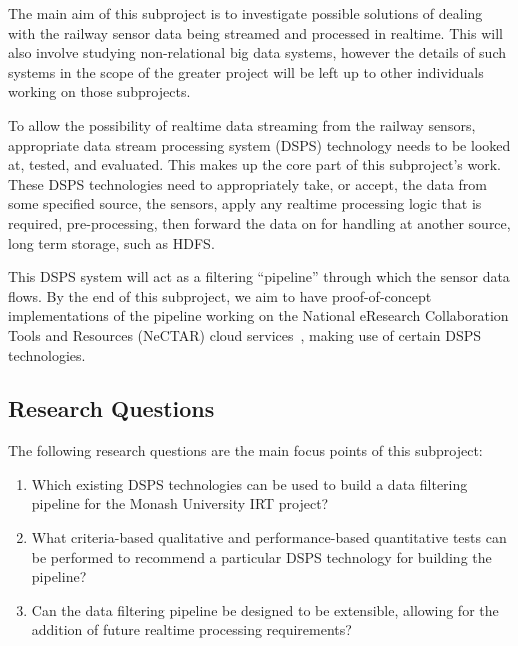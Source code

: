The main aim of this subproject is to investigate possible solutions of dealing with the railway sensor data being
streamed and processed in realtime. This will also involve studying non-relational big data systems, however the details
of such systems in the scope of the greater project will be left up to other individuals working on those subprojects.

To allow the possibility of realtime data streaming from the railway sensors, appropriate data stream processing system
(DSPS) technology needs to be looked at, tested, and evaluated. This makes up the core part of this subproject's work.
These DSPS technologies need to appropriately take, or accept, the data from some specified source, \eg the sensors, apply
any realtime processing logic that is required, \eg pre-processing, then forward the data on for handling at
another source, \eg long term storage, such as HDFS.

This DSPS system will act as a filtering ``pipeline'' through which the sensor data flows.
By the end of this subproject, we aim to have proof-of-concept implementations of the pipeline working on the National
eResearch Collaboration Tools and Resources (NeCTAR) cloud services~\cite{web:Nectar}, making use of certain DSPS
technologies.




\subsection{Research Questions} %
\label{sub:research_questions}

The following research questions are the main focus points of this subproject:

\begin{enumerate}
  \item\label{item:dsps} Which existing DSPS technologies can be used to build a data filtering pipeline for the Monash
  University IRT project?
  \item\label{item:pipeline} What criteria-based qualitative and performance-based quantitative tests can be performed
  to recommend a particular DSPS technology for building the pipeline?
  \item\label{item:recommendations} Can the data filtering pipeline be designed to be extensible, allowing for the
  addition of future realtime processing requirements?
\end{enumerate}

